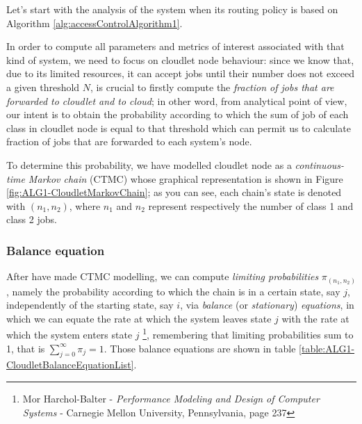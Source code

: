 \documentclass[10pt,a4paper]{article}
\begin{document}
Let's start with the analysis of the system when its routing policy is based on Algorithm \ref{alg:accessControlAlgorithm1}.

In order to compute all parameters and metrics of interest associated with that kind of system, we need to focus on  cloudlet node behaviour: since we know that, due to its limited resources, it can accept jobs until their number does not exceed a given threshold $N$, is crucial to firstly compute the \textit{fraction of jobs that are forwarded to cloudlet and to cloud}; in other word, from analytical point of view, our intent is to obtain the probability according to which the sum of job of each class in cloudlet node is equal to that threshold which can permit us to calculate fraction of jobs that are forwarded to each system's node.

To determine this probability, we have modelled cloudlet node as a \textit{continuous-time Markov chain} (CTMC) whose graphical representation is shown in Figure \ref{fig:ALG1-CloudletMarkovChain}; as you can see, each chain's state is denoted with $(n_1,n_2)$, where $n_1$ and $n_2$ represent respectively the number of class 1 and class 2 jobs.

\subsubsection{Balance equation} 

After have made CTMC modelling, we can compute \textit{limiting probabilities} $\pi_{(n_1,n_2)}$, namely the probability according to which the chain is in a certain state, say $j$, independently of the starting state, say $i$, via \textit{balance} (or \textit{stationary}) \textit{equations}, in which we can equate the rate at which the system leaves state $j$ with the rate at which the system enters state $j$ \footnote{Mor Harchol-Balter - \textit{Performance Modeling and Design of Computer Systems} - Carnegie Mellon University, Pennsylvania, page 237}, remembering that limiting probabilities sum to 1, that is $\sum_{j=0}^\infty \pi_j = 1$. Those balance equations are shown in table \ref{table:ALG1-CloudletBalanceEquationList}.
\end{document}
